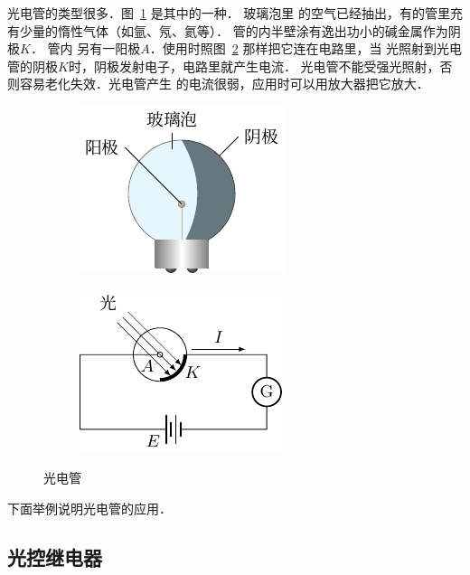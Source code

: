 光电管的类型很多．图~\ref{fig_C_7-3a} 是其中的一种．
玻璃泡里
的空气已经抽出，有的管里充有少量的惰性气体（如氩、氖、氦等）．
管的内半壁涂有逸出功小的碱金属作为阴极$K$．
管内
另有一阳极$A$．使用时照图~\ref{fig_C_7-3b} 那样把它连在电路里，当
光照射到光电管的阴极$K$时，阴极发射电子，电路里就产生电流．
光电管不能受强光照射，否则容易老化失效．光电管产生
的电流很弱，应用时可以用放大器把它放大．
\begin{figure}[htbp]
    \centering
    \begin{subfigure}{0.4\linewidth}
        \centering
        \includegraphics{fig/C/7-3a.pdf}
        \caption{}\label{fig_C_7-3a}
    \end{subfigure}
    \hfil
    \begin{subfigure}{0.4\linewidth}
        \centering
        \includegraphics{fig/C/7-3b.pdf}
        \caption{}\label{fig_C_7-3b}
    \end{subfigure}
    \caption{光电管}\label{fig_C_7-3}
\end{figure}

下面举例说明光电管的应用．

\subsection{光控继电器}

